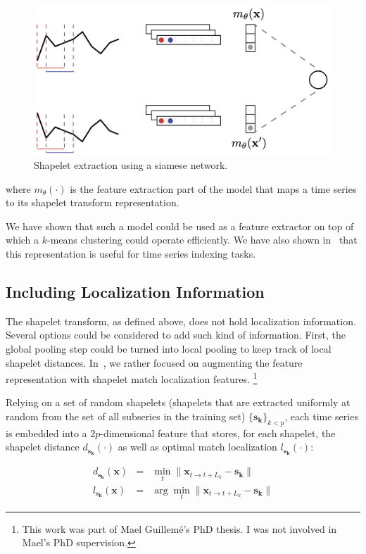 \begin{figure}[t]
\centering
\includegraphics[width=.8\textwidth]{fig/siamese_ldps}
\caption{Shapelet extraction using a siamese network. \label{fig:siamese}}
\end{figure}

where $m_\theta(\cdot)$ is the feature extraction part of the model that
maps a time series to its shapelet transform representation.

We have shown that such a model could be used as a feature extractor on top of
which a $k$-means clustering could operate efficiently.
We have also shown in~\cite{carlinisperandio:hal-01841995} that this
representation is useful for time series indexing tasks.

\subsection{Including Localization Information}

The shapelet transform, as defined above, does not hold localization
information. Several options could be considered to add such kind of
information. First, the global pooling step could be turned into local pooling
to keep track of local shapelet distances.
In~\cite{guilleme:hal-02513295}, we rather focused on augmenting the feature
representation with shapelet match localization features.%
\footnote{This work was part of Mael Guillemé's PhD thesis.
I was not involved in Mael's PhD supervision.}

Relying on a set of random shapelets (shapelets that are extracted uniformly at
random from the set of all subseries in the training set)
$\{\mathbf{s_k}\}_{k < p}$,
each time series is embedded into a $2p$-dimensional feature that stores, for
each shapelet, the shapelet distance $d_{\mathbf{s_k}}(\cdot)$ as well as
optimal  match localization $l_{\mathbf{s_k}}(\cdot)$:

\begin{eqnarray}
    d_{\mathbf{s_k}}(\mathbf{x}) &=& \min_t
        \|\mathbf{x}_{t \rightarrow t+L_k} - \mathbf{s_k}\| \\
    l_{\mathbf{s_k}}(\mathbf{x}) &=& \arg \min_t
        \|\mathbf{x}_{t \rightarrow t+L_k} - \mathbf{s_k}\|
\end{eqnarray}

